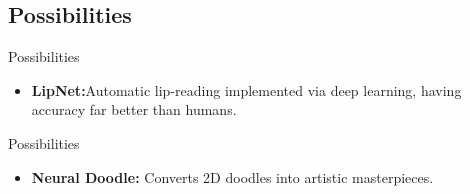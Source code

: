 \documentclass[10pt]{beamer}
\begin{document}
	\subsection{Possibilities}
	\begin{frame}[t]{Possibilities}
		\begin{itemize}
			\item \large{\textbf{LipNet:}Automatic lip-reading implemented via deep learning, having accuracy far better than humans.}
		\end{itemize}
	\end{frame}
	\begin{frame}[t]{Possibilities}
		\begin{itemize}
		\item \large{\textbf{Neural Doodle:} Converts 2D doodles into artistic masterpieces.}
		\end{itemize}
	\end{frame}
\end{document}
